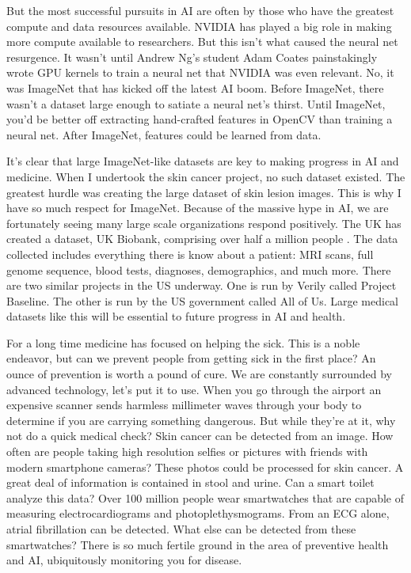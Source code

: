 But the most successful pursuits in AI are often by those who have the greatest compute and data resources available.  NVIDIA has played a big role in making more compute available to researchers.  But this isn't what caused the neural net resurgence.  It wasn't until Andrew Ng's student Adam Coates painstakingly wrote GPU kernels to train a neural net \cite{coates2013deep} that NVIDIA was even relevant.  No, it was ImageNet that has kicked off the latest AI boom.  Before ImageNet, there wasn't a dataset large enough to satiate a neural net's thirst.  Until ImageNet, you'd be better off extracting hand-crafted features in OpenCV than training a neural net.  After ImageNet, features could be learned from data.

It's clear that large ImageNet-like datasets are key to making progress in AI and medicine.  When I undertook the skin cancer project, no such dataset existed.  The greatest hurdle was creating the large dataset of skin lesion images.  This is why I have so much respect for ImageNet.  Because of the massive hype in AI, we are fortunately seeing many large scale organizations respond positively.  The UK has created a dataset, UK Biobank, comprising over half a million people \cite{sudlow2015uk}.  The data collected includes everything there is know about a patient: MRI scans, full genome sequence, blood tests, diagnoses, demographics, and much more.  There are two similar projects in the US underway.  One is run by Verily called Project Baseline.  The other is run by the US government called All of Us.  Large medical datasets like this will be essential to future progress in AI and health.

For a long time medicine has focused on helping the sick.  This is a noble endeavor, but can we prevent people from getting sick in the first place?  An ounce of prevention is worth a pound of cure.  We are constantly surrounded by advanced technology, let's put it to use.  When you go through the airport an expensive scanner sends harmless millimeter waves through your body to determine if you are carrying something dangerous.  But while they're at it, why not do a quick medical check?  Skin cancer can be detected from an image.  How often are people taking high resolution selfies or pictures with friends with modern smartphone cameras?  These photos could be processed for skin cancer.  A great deal of information is contained in stool and urine.  Can a smart toilet analyze this data?  Over 100 million people wear smartwatches that are capable of measuring electrocardiograms and photoplethysmograms.  From an ECG alone, atrial fibrillation can be detected.  What else can be detected from these smartwatches?  There is so much fertile ground in the area of preventive health and AI, ubiquitously monitoring you for disease.

